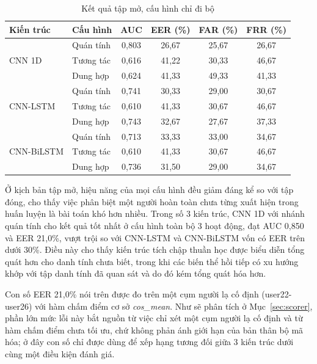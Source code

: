 \documentclass[../DoAn.tex]{subfiles}
\begin{document}
\begin{table}[H]
    \centering
    \caption{Kết quả tập mở, cấu hình chỉ đi bộ}
    \label{tab:open_walk}
    \begin{tabular}{|l|l|c|c|c|c|}
    \hline
    \textbf{Kiến trúc} & \textbf{Cấu hình} & \textbf{AUC} & \textbf{EER (\%)} & \textbf{FAR (\%)} & \textbf{FRR (\%)} \\
    \hline
    \multirow{3}{*}{CNN 1D}     & Quán tính & 0,803 & 26,67 & 25,67 & 26,67 \\
                                & Tương tác & 0,616 & 41,22 & 30,33 & 46,67 \\
                                & Dung hợp  & 0,624 & 41,33 & 49,33 & 41,33 \\
    \hline
    \multirow{3}{*}{CNN-LSTM}   & Quán tính & 0,741 & 30,33 & 29,00 & 30,67 \\
                                & Tương tác & 0,610 & 41,33 & 30,67 & 46,67 \\
                                & Dung hợp  & 0,743 & 32,67 & 27,67 & 37,33 \\
    \hline
    \multirow{3}{*}{CNN-BiLSTM} & Quán tính & 0,713 & 33,33 & 33,00 & 34,67 \\
                                & Tương tác & 0,610 & 41,33 & 30,67 & 46,67 \\
                                & Dung hợp  & 0,736 & 31,50 & 29,00 & 34,67 \\
    \hline
    \end{tabular}
\end{table}

Ở kịch bản tập mở, hiệu năng của mọi cấu hình đều giảm đáng kể so với tập đóng, cho thấy việc phân biệt một người hoàn toàn chưa từng xuất hiện trong huấn luyện là bài toán khó hơn nhiều. Trong số 3 kiến trúc, CNN 1D với nhánh quán tính cho kết quả tốt nhất ở cấu hình toàn bộ 3 hoạt động, đạt AUC 0,850 và EER 21,0\%, vượt trội so với CNN-LSTM và CNN-BiLSTM vốn có EER trên dưới 30\%. Điều này cho thấy kiến trúc tích chập thuần học được biểu diễn tổng quát hơn cho danh tính chưa biết, trong khi các biến thể hồi tiếp có xu hướng khớp với tập danh tính đã quan sát và do đó kém tổng quát hóa hơn.

Con số EER 21,0\% nói trên được đo trên một cụm người lạ cố định (user22-user26) với hàm chấm điểm cơ sở \textit{cos\_mean}. Như sẽ phân tích ở Mục~\ref{sec:scorer}, phần lớn mức lỗi này bắt nguồn từ việc chỉ xét một cụm người lạ cố định và từ hàm chấm điểm chưa tối ưu, chứ không phản ánh giới hạn của bản thân bộ mã hóa; ở đây con số chỉ được dùng để xếp hạng tương đối giữa 3 kiến trúc dưới cùng một điều kiện đánh giá.
\end{document}
